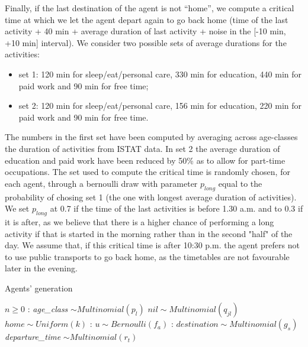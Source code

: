 Finally, if the last destination of the agent is not “home”, we compute a critical time at which we let the agent depart again to go back home (time of the last activity + 40 min + average duration of last activity \cite{site11} + noise in the [-10 min, +10 min] interval). We consider two possible sets of average durations for the activities:
\begin{itemize}
\item set 1: 120 min for sleep/eat/personal care, 330 min for education, 440 min for paid work and 90 min for free time;
\item set 2: 120 min for sleep/eat/personal care, 156 min for education, 220 min for paid work and 90 min for free time.
\end{itemize}
The numbers in the first set have been computed by averaging across age-classes the duration of activities from ISTAT data. In set 2 the average duration of education and paid work have been reduced by 50\% as to allow for part-time occupations. 
The set used to compute the critical time is randomly chosen, for each agent, through a bernoulli draw with parameter $p_{long}$ equal to the probability of chosing set 1 (the one with longest average duration of activities). We set $p_{long}$ at 0.7 if the time of the last activities is before 1.30 a.m. and to 0.3 if it is after, as we believe that there is a higher chance of performing a long activity if that is started in the morning rather than in the second "half" of the day.
We assume that, if this critical time is after 10:30 p.m. the agent prefers not to use public transports to go back home, as the timetables are not favourable later in the evening.

\begin{algorithm}
\caption{Agents' generation}\label{alg1}
\begin{algorithmic}
\Require $n \geq 0$
:
\State \textit{age\_class} $\sim Multinomial(p_l)$ 
\State $nil \sim Multinomial(q_{jl})$ 
\State $home \sim Uniform(k)$ 
:
\State $ u \sim Bernoulli(f_a)$ 
:
    \State $destination \sim Multinomial(g_s)$ \\
    \State \textit{departure\_time} $\sim Multinomial(r_t)$ \\
\EndIf
\EndFor
\EndFor
\end{algorithmic}
\end{algorithm}

